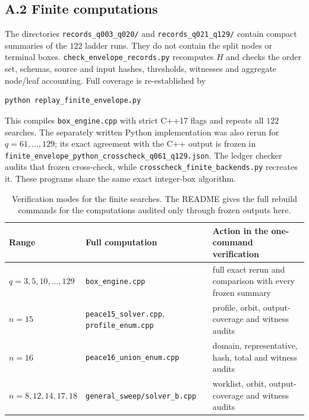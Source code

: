 \documentclass[11pt]{amsart}
\theoremstyle{definition}
\theoremstyle{remark}
\newcommand{\bs}{\discretionary{}{}{}}
\begin{document}
\subsection*{A.2 Finite computations}

The directories \texttt{records\_\bs{}q003\_\bs{}q020/} and
\texttt{records\_\bs{}q021\_\bs{}q129/} contain compact summaries of the
$122$ ladder runs.  They do not contain the split nodes or terminal boxes.
\texttt{check\_\bs{}envelope\_\bs{}records.py} recomputes $H$ and checks the
order set, schemas, source and input hashes, thresholds, witnesses and
aggregate node/leaf accounting.  Full coverage is re-established by
\begin{verbatim}
python replay_finite_envelope.py
\end{verbatim}
This compiles \texttt{box\_\bs{}engine.cpp} with strict C++17 flags and
repeats all $122$ searches.  The separately written Python implementation
was also rerun for $q=61,\ldots,129$; its exact agreement with the C++ output
is frozen in
\texttt{finite\_\bs{}envelope\_\bs{}python\_\bs{}crosscheck\_\bs{}q061\_\bs{}q129.json}.
The ledger checker audits that frozen cross-check, while
\texttt{crosscheck\_\bs{}finite\_\bs{}backends.py} recreates it.  These
programs share the same exact integer-box algorithm.

\begin{table}[ht]
\centering\small
\begin{tabular}{@{}
>{\raggedright\arraybackslash}p{}
>{\raggedright\arraybackslash}p{}
>{\raggedright\arraybackslash}p{}@{}}
\toprule
Range & Full computation & Action in the one-command verification\\
\midrule
$q=3,5,10,\ldots,129$ &
\texttt{box\_\bs{}engine.cpp} &
full exact rerun and comparison with every frozen summary\\
$n=15$ &
\texttt{peace15\_\bs{}solver.cpp}, \texttt{profile\_\bs{}enum.cpp} &
profile, orbit, output-coverage and witness audits\\
$n=16$ &
\texttt{peace16\_\bs{}union\_\bs{}enum.cpp} &
domain, representative, hash, total and witness audits\\
$n=8,12,14,17,18$ &
\texttt{general\_\bs{}sweep/solver\_\bs{}b.cpp} &
worklist, orbit, output-coverage and witness audits\\
\bottomrule
\end{tabular}
\caption{Verification modes for the finite searches.  The README gives the
full rebuild commands for the computations audited only through frozen
outputs here.}\label{tab:finite-modes}
\end{table}
\end{document}
